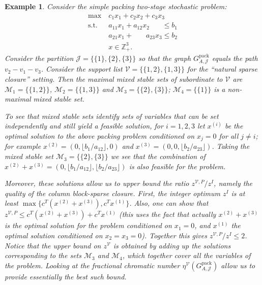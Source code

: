 \documentclass[smallextended]{svjour3}
\newtheorem{example}[proposition]{Example}
\begin{document}
	\begin{example}\label{ex:mixedStableSet}
		Consider the simple packing two-stage stochastic problem:
				\begin{align*}
			\max ~& c_1 x_1 + c_2 x_2 + c_3 x_3\\
			 \textrm{s.t.}~& a_{11} x_1 + a_{12} x_2 ~~~~~~~~ \le b_1\\
			 							 & a_{21} x_1 + ~~~~~~~~ a_{23} x_3 \le b_2\\
			 							 & x \in {\mathbb{Z}}^3_+.
		\end{align*}
		Consider the partition $\mathcal{J} = \{\{1\}, \{2\}, \{3\}\}$ so that the graph ${G^{\textrm{pack}}_{A, {\mathcal{J}}}}$ equals the path $v_2 - v_1 - v_3$. Consider the support list ${\mathcal{V}} = \{\{1,2\}, \{1,3\}\}$ for the ``natural sparse closure'' setting. Then the maximal mixed stable sets of subordinate to ${\mathcal{V}}$ are ${\mathcal{M}}_1 = \{\{1,2\}\}$, ${\mathcal{M}}_2 = \{\{1,3\}\}$ and ${\mathcal{M}}_3 = \{\{2\}, \{3\}\}$; ${\mathcal{M}}_4 = \{\{1\}\}$ is a non-maximal mixed stable set.
		
		To see that mixed stable sets identify sets of variables that can be set independently and still yield a feasible solution, for $i =1,2,3$ let $x^{(i)}$ be the optimal solution to the above packing problem conditioned on $x_j = 0$ for all $j\neq i$; for example $x^{(2)} = (0, \lfloor b_1/a_{12} \rfloor, 0)$ and $x^{(3)} = (0, 0, \lfloor b_2/a_{23}\rfloor)$. Taking the mixed stable set ${\mathcal{M}}_3 = \{\{2\},\{3\}\}$ we see that the combination of $x^{(2)} + x^{(3)} = (0, \lfloor b_1/a_{12}\rfloor, \lfloor b_2/a_{23}\rfloor)$ is also feasible for the problem.
		
		Moreover, these solutions allow us to upper bound the ratio $z^{{\mathcal{V}},P}/z^I$, namely the quality of the column block-sparse closure. First, the integer optimum $z^I$ is at least $\max\{c^T (x^{(2)} + x^{(3)}), c^T x^{(1)}\}$. Also, one can show that $z^{{\mathcal{V}},P} \le c^T (x^{(2)} + x^{(3)}) + c^T x^{(1)}$ (this uses the fact that actually $x^{(2)} + x^{(3)}$ is the optimal solution for the problem conditioned on $x_1 = 0$, and $x^{(1)}$ the optimal solution conditioned on $x_2 = x_3 = 0$). Together this gives $z^{{\mathcal{V}},P}/z^I \le 2$. Notice that the upper bound on $z^{\mathcal{V}}$ is obtained by adding up the solutions corresponding to the sets ${\mathcal{M}}_3$ and ${\mathcal{M}}_4$, which together cover all the variables of the problem. Looking at the fractional chromatic number $\eta^{\mathcal{V}}({G^{\textrm{pack}}_{A, {\mathcal{J}}}})$ allow us to provide essentially the best such bound.
	\end{example}
\end{document}
